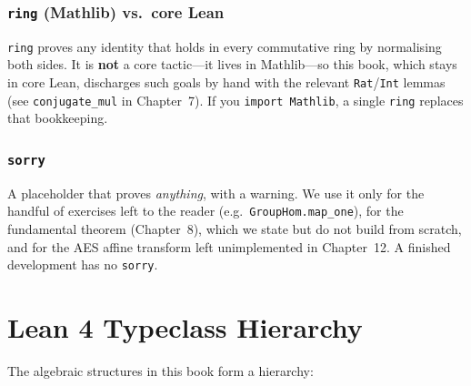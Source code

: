 \documentclass[11pt, a4paper, oneside]{book}
\newcommand{\lc}[1]{\texttt{#1}}
\newcounter{exercise}[chapter]
\begin{document}
\subsection*{\lc{ring} (Mathlib) vs.\ core Lean}

\lc{ring} proves any identity that holds in every commutative ring by
normalising both sides. It is \textbf{not} a core tactic---it lives in
Mathlib---so this book, which stays in core Lean, discharges such goals by hand
with the relevant \lc{Rat}/\lc{Int} lemmas (see \lc{conjugate\_mul} in
Chapter~7). If you \lc{import Mathlib}, a single \lc{ring} replaces that
bookkeeping.

\subsection*{\lc{sorry}}

A placeholder that proves \emph{anything}, with a warning. We use it only for
the handful of exercises left to the reader (e.g.\ \lc{GroupHom.map\_one}), for
the fundamental theorem (Chapter~8), which we state but do not build from
scratch, and for the AES affine transform left unimplemented in Chapter~12. A finished development has no \lc{sorry}.

\chapter{Lean 4 Typeclass Hierarchy}

The algebraic structures in this book form a hierarchy:

\begin{center}
\end{center}
\end{document}
